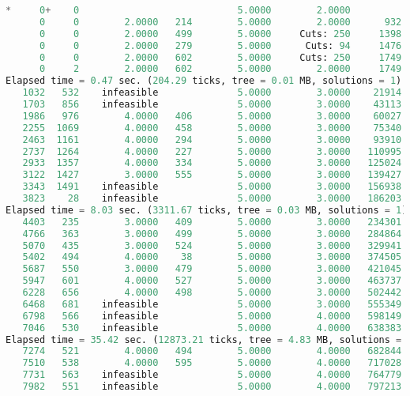 \begin{lstlisting}[language=Python]
*     0+    0                            5.0000        2.0000            60.00%
      0     0        2.0000   214        5.0000        2.0000      932   60.00%
      0     0        2.0000   499        5.0000     Cuts: 250     1398   60.00%
      0     0        2.0000   279        5.0000      Cuts: 94     1476   60.00%
      0     0        2.0000   602        5.0000     Cuts: 250     1749   60.00%
      0     2        2.0000   602        5.0000        2.0000     1749   60.00%
Elapsed time = 0.47 sec. (204.29 ticks, tree = 0.01 MB, solutions = 1)
   1032   532    infeasible              5.0000        3.0000    21914   40.00%
   1703   856    infeasible              5.0000        3.0000    43113   40.00%
   1986   976        4.0000   406        5.0000        3.0000    60027   40.00%
   2255  1069        4.0000   458        5.0000        3.0000    75340   40.00%
   2463  1161        4.0000   294        5.0000        3.0000    93910   40.00%
   2737  1264        4.0000   227        5.0000        3.0000   110995   40.00%
   2933  1357        4.0000   334        5.0000        3.0000   125024   40.00%
   3122  1427        3.0000   555        5.0000        3.0000   139427   40.00%
   3343  1491    infeasible              5.0000        3.0000   156938   40.00%
   3823    28    infeasible              5.0000        3.0000   186203   40.00%
Elapsed time = 8.03 sec. (3311.67 ticks, tree = 0.03 MB, solutions = 1)
   4403   235        3.0000   409        5.0000        3.0000   234301   40.00%
   4766   363        3.0000   499        5.0000        3.0000   284864   40.00%
   5070   435        3.0000   524        5.0000        3.0000   329941   40.00%
   5402   494        4.0000    38        5.0000        3.0000   374505   40.00%
   5687   550        3.0000   479        5.0000        3.0000   421045   40.00%
   5947   601        4.0000   527        5.0000        3.0000   463737   40.00%
   6228   656        4.0000   498        5.0000        3.0000   502442   40.00%
   6468   681    infeasible              5.0000        3.0000   555349   40.00%
   6798   566    infeasible              5.0000        4.0000   598149   20.00%
   7046   530    infeasible              5.0000        4.0000   638383   20.00%
Elapsed time = 35.42 sec. (12873.21 ticks, tree = 4.83 MB, solutions = 1)
   7274   521        4.0000   494        5.0000        4.0000   682844   20.00%
   7510   538        4.0000   595        5.0000        4.0000   717028   20.00%
   7731   563    infeasible              5.0000        4.0000   764779   20.00%
   7982   551    infeasible              5.0000        4.0000   797213   20.00%

\end{lstlisting}
